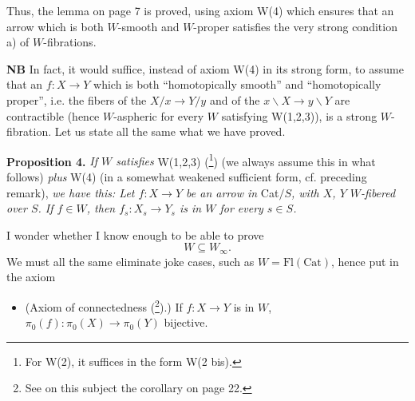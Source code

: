 \documentclass[11pt]{article}
\newcommand{\printedpage}[1]{\marginpar{\footnotesize p.~#1}}
\begin{document}
\printedpage{9}

Thus, the lemma on page 7 is proved, using axiom W(4) which ensures that an arrow which is both $W$-smooth and $W$-proper satisfies the very strong condition a) of $W$-fibrations.

\textbf{NB} In fact, it would suffice, instead of axiom W(4) in its strong form, to assume that an $f : X \longrightarrow Y$ which is both ``homotopically smooth'' and ``homotopically proper'', i.e. the fibers of the $X/x \longrightarrow Y/y$ and of the $x\backslash X \longrightarrow y\backslash Y$ are contractible (hence $W$-aspheric for every $W$ satisfying W(1,2,3)), is a strong $W$-fibration. Let us state all the same what we have proved.

\textbf{Proposition 4.} \textit{If $W$ satisfies} W(1,2,3) (\footnote[17]{For W(2), it suffices in the form W(2 bis).}) (we always assume this in what follows) \textit{plus} W(4) (in a somewhat weakened sufficient form, cf. preceding remark), \textit{we have this: Let $f : X \longrightarrow Y$ be an arrow in} Cat$/S$\textit{, with $X$, $Y$ $W$-fibered over $S$. If $f \in W$, then $f_s : X_s \longrightarrow Y_s$ is in $W$ for every $s \in S$.}

I wonder whether I know enough to be able to prove
\[ W \subseteq W_\infty . \]
We must all the same eliminate joke cases, such as $W = \mathrm{Fl}(\mathrm{Cat})$, hence put in the axiom

\begin{itemize}[leftmargin=4em, labelwidth=3em, labelsep=0.6em]
\item[W(5)] (Axiom of connectedness (\footnote[18]{See on this subject the corollary on page 22.}).) If $f : X \longrightarrow Y$ is in $W$, $\pi_0(f) : \pi_0(X) \longrightarrow \pi_0(Y)$ bijective.
\end{itemize}
\end{document}
